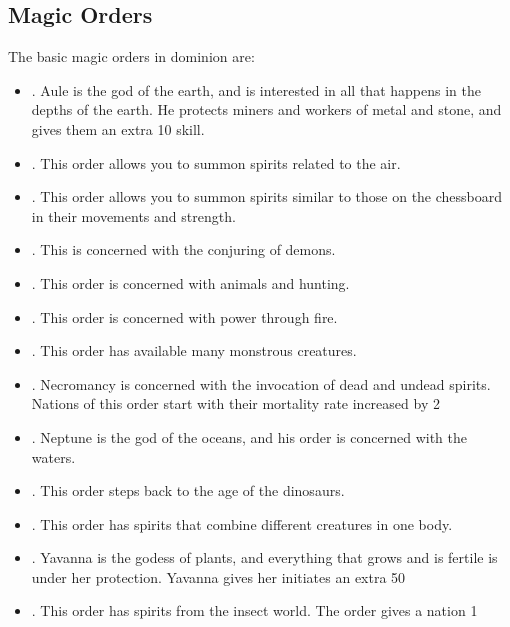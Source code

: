 \subsection{Magic Orders}

The basic magic orders in dominion are:

\begin{itemize}

\item
{}.  Aule is the god of the earth, and is interested
in all that happens in the depths of the earth.  He protects miners
and workers of metal and stone, and gives them an extra 10%
skill.

\item
{}.  This order allows you to summon spirits 
related to the air.

\item
{}.  This order allows you to summon spirits
similar to those on the chessboard in their movements and strength.

\item
{}. This is concerned with the conjuring of demons.

\item
{}.  This order is concerned with animals and hunting.

\item
{}.  This order is concerned with power through
fire.

\item
{}.  This order has available many monstrous
creatures.

\item
{}.  Necromancy is concerned with the
invocation of dead and undead spirits.  Nations of this order start
with their mortality rate increased by 2%

\item
{}.  Neptune is the god of the oceans, and his
order is concerned with the waters.

\item
{}.  This order steps back to the age of the
dinosaurs.

\item
{}.  This order has spirits that combine different
creatures in one body.

\item
{}.  Yavanna is the godess of plants, and
everything that grows and is fertile is under her protection.  Yavanna
gives her initiates an extra 50%

\item
{}.  This order has spirits from the insect
world.  The order gives a nation 1%

\end{itemize}

